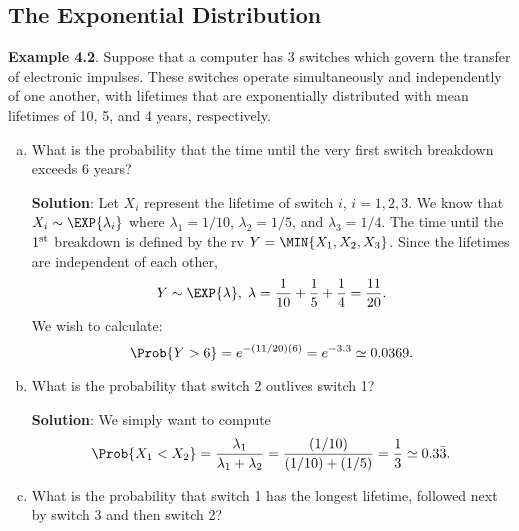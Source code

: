 \subsection*{The Exponential Distribution}
\begin{Example}
    \textbf{Example 4.2}. Suppose that a computer has 3 switches which govern the transfer of electronic
    impulses. These switches operate simultaneously and independently of one another, with
    lifetimes that are exponentially distributed with mean lifetimes of 10, 5, and 4 years,
    respectively.
    \begin{enumerate}[(a)]
        \item What is the probability that the time until the very first switch breakdown exceeds 6
              years?

              \textbf{Solution}: Let $ X_i $ represent the lifetime of switch $ i $, $ i=1,2,3 $.
              We know that $ X_i \sim \EXP{\lambda_i} $ where $ \lambda_1=1/10 $, $ \lambda_2=1/5 $,
              and $ \lambda_3=1/4 $. The time until the $ 1\textsuperscript{st} $ breakdown is defined by
              the rv $ Y=\MIN{X_1,X_2,X_3} $. Since the lifetimes are independent of each other,
              \[ Y \sim \EXP{\lambda},\; \lambda=\frac{1}{10}+\frac{1}{5}+\frac{1}{4}=\frac{11}{20}. \]
              We wish to calculate:
              \[ \Prob{Y>6}=e^{-(11/20)(6)}=e^{-3.3}\simeq 0.0369. \]
        \item What is the probability that switch 2 outlives switch 1?

              \textbf{Solution}: We simply want to compute
              \[ \Prob{X_1<X_2}=\frac{\lambda_1}{\lambda_1+\lambda_2}=\frac{(1/10)}{(1/10)+(1/5)}=\frac{1}{3}\simeq 0.3\bar{3}. \]
        \item What is the probability that switch 1 has the longest lifetime, followed next by switch 3
              and then switch 2?


\end{enumerate}
\end{Example}
